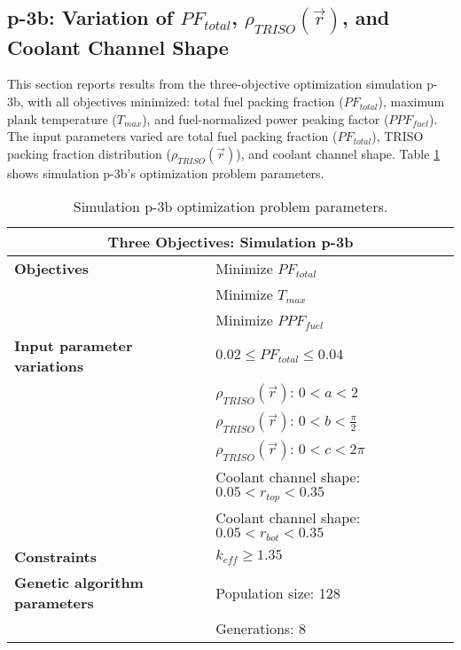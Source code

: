 \subsection{p-3b: Variation of $PF_{total}$, $\rho_{TRISO}(\vec{r})$, and Coolant 
Channel Shape}
\label{sec:p-3b}
This section reports results from the three-objective optimization simulation p-3b, 
with all objectives minimized: total fuel packing fraction ($PF_{total}$), maximum plank 
temperature ($T_{max}$), and fuel-normalized power peaking factor ($PPF_{fuel}$).  
The input parameters varied are total fuel packing fraction ($PF_{total}$), 
TRISO packing fraction distribution ($\rho_{TRISO}(\vec{r})$), and coolant channel 
shape.  
Table \ref{tab:simulationp3b} shows simulation p-3b's optimization problem parameters. 
\begin{table}[htbp!]
    \centering
    \onehalfspacing
    \caption{Simulation p-3b optimization problem parameters.}
	\label{tab:simulationp3b}
    \footnotesize
    \begin{tabular}{l|p{6.5cm}}
    \hline 
    \multicolumn{2}{c}{\textbf{Three Objectives: Simulation p-3b}} \\
    \hline 
    \textbf{Objectives} & Minimize $PF_{total}$ \\
    & Minimize $T_{max}$ \\
    & Minimize $PPF_{fuel}$ \\
    \hline 
    \textbf{Input parameter variations} & $0.02 \leq PF_{total} \leq 0.04$ \\
    & $\rho_{TRISO}(\vec{r})$: $0<a<2$ \\
    & $\rho_{TRISO}(\vec{r})$: $0<b<\frac{\pi}{2}$ \\
    & $\rho_{TRISO}(\vec{r})$: $0<c<2\pi$ \\
    & Coolant channel shape: $0.05<r_{top}<0.35$ \\
    & Coolant channel shape: $0.05<r_{bot}<0.35$ \\
    \hline
    \textbf{Constraints} & $k_{eff} \geq 1.35$\\ 
    \hline 
    \textbf{Genetic algorithm parameters} & Population size: 128 \\
    & Generations: 8 \\
    \hline
    \end{tabular}
\end{table}

